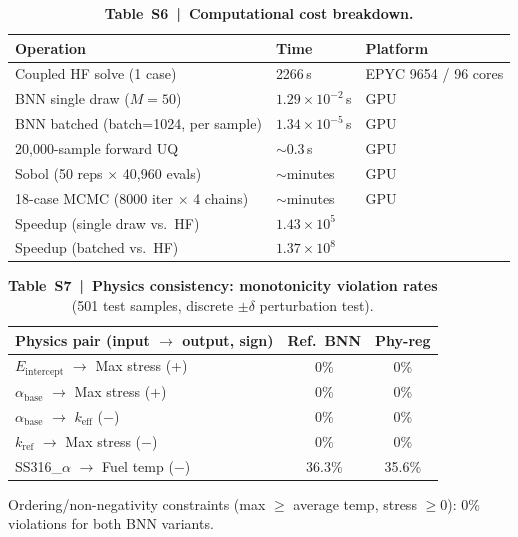 \documentclass[11pt,a4paper]{article}
\newcommand{\keff}{\ensuremath{k_{\mathrm{eff}}}}
\newcommand{\Eint}{\ensuremath{E_{\mathrm{intercept}}}}
\newcommand{\abase}{\ensuremath{\alpha_{\mathrm{base}}}}
\newcommand{\kref}{\ensuremath{k_{\mathrm{ref}}}}
\begin{document}
\begin{table}[htbp]
\centering
\caption{\textbf{Table~S6~|~Computational cost breakdown.}}
\label{tab:S6}
\smallskip
\small
\begin{tabular}{lll}
\toprule
Operation & Time & Platform \\
\midrule
Coupled HF solve (1 case) & 2266\,s & EPYC 9654 / 96 cores \\
BNN single draw ($M=50$) & $1.29\times10^{-2}$\,s & GPU \\
BNN batched (batch=1024, per sample) & $1.34\times10^{-5}$\,s & GPU \\
20,000-sample forward UQ & ${\sim}0.3$\,s & GPU \\
Sobol (50 reps $\times$ 40,960 evals) & ${\sim}$minutes & GPU \\
18-case MCMC (8000 iter $\times$ 4 chains) & ${\sim}$minutes & GPU \\
\midrule
Speedup (single draw vs.\ HF) & $1.43\times10^{5}$ & \\
Speedup (batched vs.\ HF) & $1.37\times10^{8}$ & \\
\bottomrule
\end{tabular}
\end{table}

\begin{table}[htbp]
\centering
\caption{\textbf{Table~S7~|~Physics consistency: monotonicity violation
rates} (501 test samples, discrete $\pm\delta$ perturbation test).}
\label{tab:S7}
\smallskip
\small
\begin{tabular}{lcc}
\toprule
Physics pair (input $\to$ output, sign) & Ref.\ BNN & Phy-reg \\
\midrule
\Eint{} $\to$ Max stress (+)     & 0\% & 0\% \\
\abase{} $\to$ Max stress (+)    & 0\% & 0\% \\
\abase{} $\to$ \keff{} ($-$)     & 0\% & 0\% \\
\kref{} $\to$ Max stress ($-$)   & 0\% & 0\% \\
SS316\_$\alpha$ $\to$ Fuel temp ($-$) & 36.3\% & 35.6\% \\
\bottomrule
\end{tabular}

\smallskip
Ordering/non-negativity constraints (max $\geq$ average temp, stress $\geq 0$):
0\% violations for both BNN variants.
\end{table}
\end{document}
